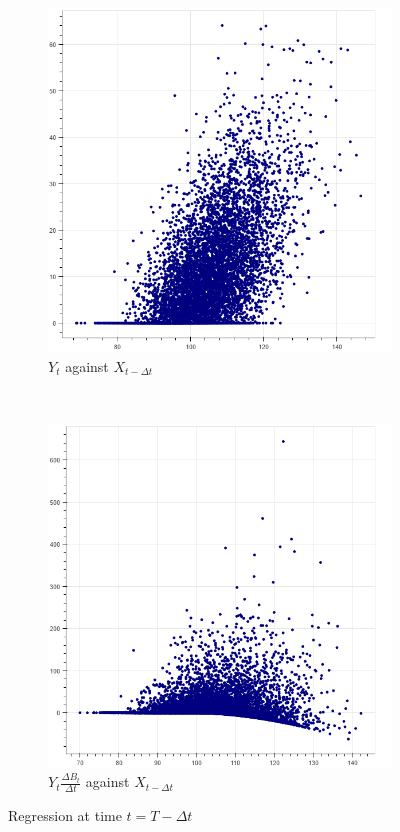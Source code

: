 \documentclass[english,11pt,openany]{report}
\theoremstyle{definition}
\theoremstyle{plain}
\theoremstyle{definition}
\begin{document}
\begin{figure}[H]
	\centering
	
	\begin{subfigure}[t]{0.3\textwidth}
		\includegraphics[width=\textwidth]{RF_analysis/Y_X.png}
		\caption{$Y_{t}$ against $X_{t-\Delta t}$}
		\label{fig:Y_X} %
	\end{subfigure}
	~~~~~~~~~~~~~~~
	\begin{subfigure}[t]{0.3\textwidth}
		\includegraphics[width=\textwidth]{RF_analysis/Z_X.png}
		\caption{$Y_{t}\frac{\Delta B_t}{\Delta t}$ against $X_{t-\Delta t}$}
		\label{fig:Z_X}
	\end{subfigure}

	\caption{Regression at time $t=T- \Delta t$ \label{fig:plotY_Z}}
\end{figure}
\end{document}
